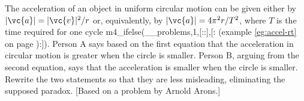  The acceleration of an object in uniform circular motion
can be given either by $|\vc{a}|=|\vc{v}|^2/r$ or, equivalently, by
$|\vc{a}|=4\pi^2r/T^2$, where $T$ is the time required for one
cycle%
m4_ifelse(__problems,1,[::],[: (example \ref{eg:accel-rt} on page \pageref{eg:accel-rt}):]). Person A says based on the first equation that
the acceleration in circular motion is greater when the
circle is smaller. Person B, arguing from the second
equation, says that the acceleration is smaller when the
circle is smaller. Rewrite the two statements so that they
are less misleading, eliminating the supposed paradox.
[Based on a problem by Arnold Arons.]
